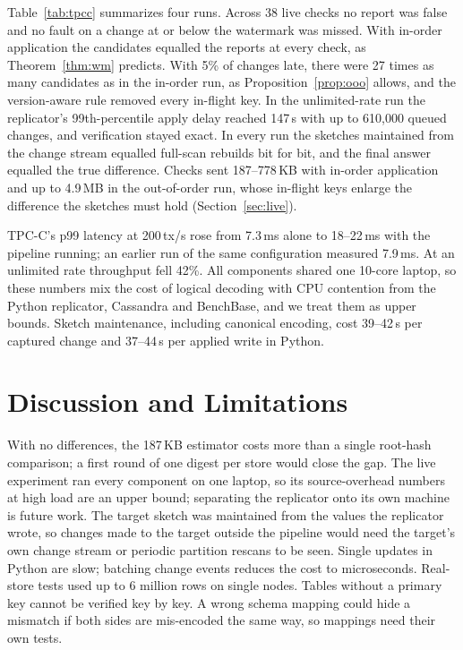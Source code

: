 \documentclass[conference]{IEEEtran}
\begin{document}
Table~\ref{tab:tpcc} summarizes four runs. Across 38 live checks no report was false and no fault on a change at or below the watermark was missed. With in-order application the candidates equalled the reports at every check, as Theorem~\ref{thm:wm} predicts. With 5\% of changes late, there were 27 times as many candidates as in the in-order run, as Proposition~\ref{prop:ooo} allows, and the version-aware rule removed every in-flight key. In the unlimited-rate run the replicator's 99th-percentile apply delay reached 147\,s with up to 610{,}000 queued changes, and verification stayed exact. In every run the sketches maintained from the change stream equalled full-scan rebuilds bit for bit, and the final answer equalled the true difference. Checks sent 187--778\,KB with in-order application and up to 4.9\,MB in the out-of-order run, whose in-flight keys enlarge the difference the sketches must hold (Section~\ref{sec:live}).

TPC-C's p99 latency at 200\,tx/s rose from 7.3\,ms alone to 18--22\,ms with the pipeline running; an earlier run of the same configuration measured 7.9\,ms. At an unlimited rate throughput fell 42\%. All components shared one 10-core laptop, so these numbers mix the cost of logical decoding with CPU contention from the Python replicator, Cassandra and BenchBase, and we treat them as upper bounds. Sketch maintenance, including canonical encoding, cost 39--42\,\textmu s per captured change and 37--44\,\textmu s per applied write in Python.

\section{Discussion and Limitations}
With no differences, the 187\,KB estimator costs more than a single root-hash comparison; a first round of one digest per store would close the gap. The live experiment ran every component on one laptop, so its source-overhead numbers at high load are an upper bound; separating the replicator onto its own machine is future work. The target sketch was maintained from the values the replicator wrote, so changes made to the target outside the pipeline would need the target's own change stream or periodic partition rescans to be seen. Single updates in Python are slow; batching change events reduces the cost to microseconds. Real-store tests used up to 6 million rows on single nodes. Tables without a primary key cannot be verified key by key. A wrong schema mapping could hide a mismatch if both sides are mis-encoded the same way, so mappings need their own tests.
\end{document}
